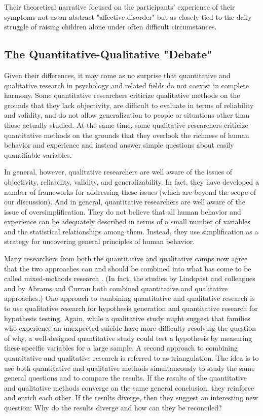 Their theoretical narrative focused on the participants' experience of their symptoms not as an abstract "affective disorder" but as closely tied to the daily struggle of raising children alone under often difficult circumstances.

\subsection{The Quantitative-Qualitative "Debate"}

Given their differences, it may come as no surprise that quantitative and qualitative research in psychology and related fields do not coexist in complete harmony. Some quantitative researchers criticize qualitative methods on the grounds that they lack objectivity, are difficult to evaluate in terms of reliability and validity, and do not allow generalization to people or situations other than those actually studied. At the same time, some qualitative researchers criticize quantitative methods on the grounds that they overlook the richness of human behavior and experience and instead answer simple questions about easily quantifiable variables.

In general, however, qualitative researchers are well aware of the issues of objectivity, reliability, validity, and generalizability. In fact, they have developed a number of frameworks for addressing these issues (which are beyond the scope of our discussion). And in general, quantitative researchers are well aware of the issue of oversimplification. They do not believe that all human behavior and experience can be adequately described in terms of a small number of variables and the statistical relationships among them. Instead, they use simplification as a strategy for uncovering general principles of human behavior.

Many researchers from both the quantitative and qualitative camps now agree that the two approaches can and should be combined into what has come to be called mixed-methods research \citep{todd_mixing_2004}. (In fact, the studies by Lindqvist and colleagues and by Abrams and Curran both combined quantitative and qualitative approaches.) One approach to combining quantitative and qualitative research is to use qualitative research for hypothesis generation and quantitative research for hypothesis testing. Again, while a qualitative study might suggest that families who experience an unexpected suicide have more difficulty resolving the question of why, a well-designed quantitative study could test a hypothesis by measuring these specific variables for a large sample. A second approach to combining quantitative and qualitative research is referred to as triangulation. The idea is to use both quantitative and qualitative methods simultaneously to study the same general questions and to compare the results. If the results of the quantitative and qualitative methods converge on the same general conclusion, they reinforce and enrich each other. If the results diverge, then they suggest an interesting new question: Why do the results diverge and how can they be reconciled?

